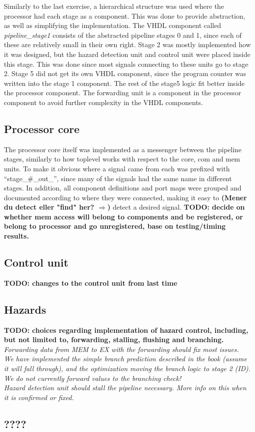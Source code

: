 Similarly to the last exercise, a hierarchical structure was used where the
processor had each stage as a component. This was done to provide abstraction,
as well as simplifying the implementation. The VHDL component called
\emph{pipeline\_stage1} consists of the abstracted pipeline stages 0 and 1,
since each of these are relatively small in their own right. Stage 2 was
mostly implemented how it was designed, but the hazard detection unit and
control unit were placed inside this stage. This was done since most signals
connecting to these units go to stage 2. Stage 5 did not get its own VHDL
component, since the program counter was written into the stage 1 component. The
rest of the stage5 logic fit better inside the processor component. The
forwarding unit is a component in the processor component to avoid further
complexity in the VHDL components.

\subsection{Processor core}
The processor core itself was implemented as a messenger between the pipeline
stages, similarly to how toplevel works with respect to the core, com and mem
units. To make it obvious where a signal came from each was prefixed with
``stage\_\#\_out\_'', since many of the signals had the same name in different
stages. In addition, all component definitions and port maps were grouped and
documented according to where they were connected, making it easy to \textbf{(Mener du detect eller "find" her? $\Rightarrow$)} detect a desired signal.
\textbf{TODO: decide on whether mem access will belong to components and be registered, or belong to processor and go unregistered, base on testing/timing results.}

\subsection{Control unit}
\textbf{TODO: changes to the control unit from last time}
\subsection{Hazards}
\textbf{TODO: choices regarding implementation of hazard control, including, but not limited to, forwarding, stalling, flushing and branching.}
\emph{Forwarding data from MEM to EX with the forwarding should fix most issues.
\\
We have implemented the simple branch prediction described in the book
(assume it will fall through), and the optimization moving the branch logic to
stage 2 (ID). We do not currently forward values to the branching check!
\\
Hazard detection unit should stall the pipeline necessary. More info on this
when it is confirmed or fixed.}

\subsection{????}